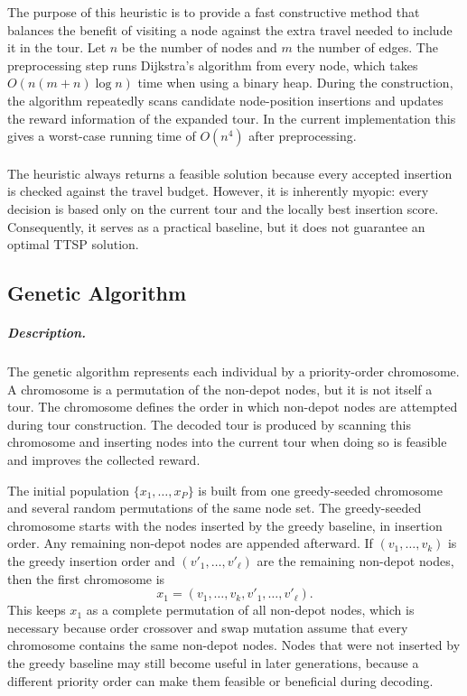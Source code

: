 \documentclass[report,english,cleveref,autoref,a4paper]{lipics-v2021}
\begin{document}
The purpose of this heuristic is to provide a fast constructive method that
balances the benefit of visiting a node against the extra travel needed to
include it in the tour. Let $n$ be the number of nodes and $m$ the number of
edges. The preprocessing step runs Dijkstra's algorithm from every node, which
takes $O(n(m+n)\log n)$ time when using a binary heap. During the construction,
the algorithm repeatedly scans candidate node-position insertions and updates
the reward information of the expanded tour. In the current implementation this
gives a worst-case running time of $O(n^4)$ after preprocessing.
\\ \\
The heuristic always returns a feasible solution because every accepted
insertion is checked against the travel budget. However, it is inherently
myopic: every decision is based only on the current tour and the locally best
insertion score. Consequently, it serves as a practical baseline, but it does
not guarantee an optimal TTSP solution.

\subsection{Genetic Algorithm}

\subparagraph{Description.}

The genetic algorithm represents each individual by a priority-order
chromosome. A chromosome is a permutation of the non-depot nodes, but it is not
itself a tour. The chromosome defines the order in which non-depot nodes are
attempted during tour construction. The decoded tour is produced by scanning
this chromosome and inserting nodes into the current tour when doing so is
feasible and improves the collected reward.

The initial population $\{x_1,\ldots,x_P\}$ is built from one greedy-seeded
chromosome and several random permutations of the same node set. The
greedy-seeded chromosome starts with the nodes inserted by the greedy baseline,
in insertion order. Any remaining non-depot nodes are appended afterward. If
$(v_1,\ldots,v_k)$ is the greedy insertion order and
$(v'_1,\ldots,v'_\ell)$ are the remaining non-depot nodes, then the first
chromosome is
\[
    x_1 = (v_1,\ldots,v_k,v'_1,\ldots,v'_\ell).
\]
This keeps $x_1$ as a complete permutation of all non-depot nodes, which is
necessary because order crossover and swap mutation assume that every
chromosome contains the same non-depot nodes. Nodes that were not inserted by the
greedy baseline may still become useful in later generations, because a
different priority order can make them feasible or beneficial during decoding.
\end{document}
